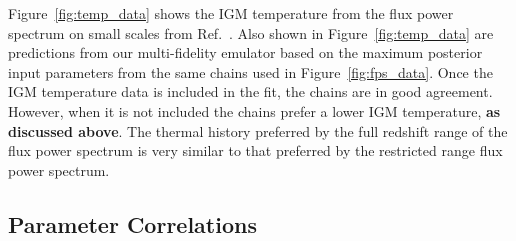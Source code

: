 Figure~\ref{fig:temp_data} shows the IGM temperature from the flux power spectrum on small scales from Ref.~\cite{2021MNRAS.506.4389G}.
Also shown in Figure~\ref{fig:temp_data} are predictions from our multi-fidelity emulator based on the maximum posterior input parameters from the same chains used in Figure~\ref{fig:fps_data}.
Once the IGM temperature data is included in the fit, the chains are in good agreement.
However, when it is not included the chains prefer a lower IGM temperature, \textbf{as discussed above}.
The thermal history preferred by the full redshift range of the flux power spectrum is very similar to that preferred by the restricted range flux power spectrum. 

\subsection{Parameter Correlations}
\label{sec:correlations}

